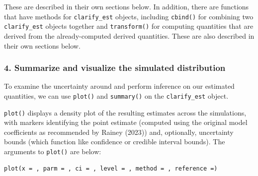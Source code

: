 These are described in their own sections below. In addition, there are functions that have methods for \texttt{clarify\_est} objects, including \texttt{cbind()} for combining two \texttt{clarify\_est} objects together and \texttt{transform()} for computing quantities that are derived from the already-computed derived quantities. These are also described in their own sections below.

\hypertarget{summarize-and-visualize-the-simulated-distribution}{%
\subsubsection{4. Summarize and visualize the simulated distribution}\label{summarize-and-visualize-the-simulated-distribution}}

To examine the uncertainty around and perform inference on our estimated quantities, we can use \texttt{plot()} and \texttt{summary()} on the \texttt{clarify\_est} object.

\texttt{plot()} displays a density plot of the resulting estimates across the simulations, with markers identifying the point estimate (computed using the original model coefficients as recommended by Rainey (2023)) and, optionally, uncertainty bounds (which function like confidence or credible interval bounds). The arguments to \texttt{plot()} are below:

\begin{verbatim}
plot(x = , parm = , ci = , level = , method = , reference =)
\end{verbatim}

